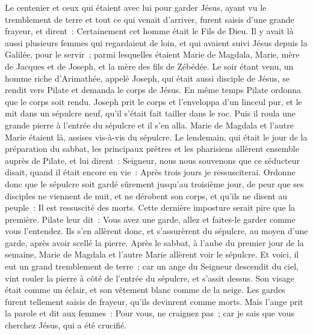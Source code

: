 \begin{multicols}{2}
Le centenier et ceux qui étaient avec lui pour garder Jésus, ayant vu le tremblement de terre et tout ce qui venait d'arriver, furent saisis d'une grande frayeur, et dirent~: Certainement cet homme était le Fils de Dieu.
Il y avait là aussi plusieurs femmes qui regardaient de loin, et qui avaient suivi Jésus depuis la Galilée, pour le servir~;
parmi lesquelles étaient Marie de Magdala, Marie, mère de Jacques et de Joseph, et la mère des fils de Zébédée.
Le soir étant venu, un homme riche d'Arimathée, appelé Joseph, qui était aussi disciple de Jésus,
se rendit vers Pilate et demanda le corps de Jésus. En même temps Pilate ordonna que le corps soit rendu.
Joseph prit le corps et l'enveloppa d'un linceul pur,
et le mit dans un sépulcre neuf, qu'il s'était fait tailler dans le roc. Puis il roula une grande pierre à l'entrée du sépulcre et il s'en alla.
Marie de Magdala et l'autre Marie étaient là, assises vis-à-vis du sépulcre.
Le lendemain, qui était le jour de la préparation du sabbat, les principaux prêtres et les pharisiens allèrent ensemble auprès de Pilate,
et lui dirent~: Seigneur, nous nous souvenons que ce séducteur disait, quand il était encore en vie~: Après trois jours je ressusciterai.
Ordonne donc que le sépulcre soit gardé sûrement jusqu'au troisième jour, de peur que ses disciples ne viennent de nuit, et ne dérobent son corps, et qu'ils ne disent au peuple~: Il est ressuscité des morts. Cette dernière imposture serait pire que la première.
Pilate leur dit~: Vous avez une garde, allez et faites-le garder comme vous l'entendez.
Ils s'en allèrent donc, et s'assurèrent du sépulcre, au moyen d'une garde, après avoir scellé la pierre.
\VerseOne{}Après le sabbat, à l'aube du premier jour de la semaine, Marie de Magdala et l'autre Marie allèrent voir le sépulcre.
Et voici, il eut un grand tremblement de terre~; car un ange du Seigneur descendit du ciel, vint rouler la pierre à côté de l'entrée du sépulcre, et s'assit dessus.
Son visage était comme un éclair, et son vêtement blanc comme de la neige.
Les gardes furent tellement saisis de frayeur, qu'ils devinrent comme morts.
Mais l'ange prit la parole et dit aux femmes~: Pour vous, ne craignez pas~; car je sais que vous cherchez Jésus, qui a été crucifié.

\end{multicols}
